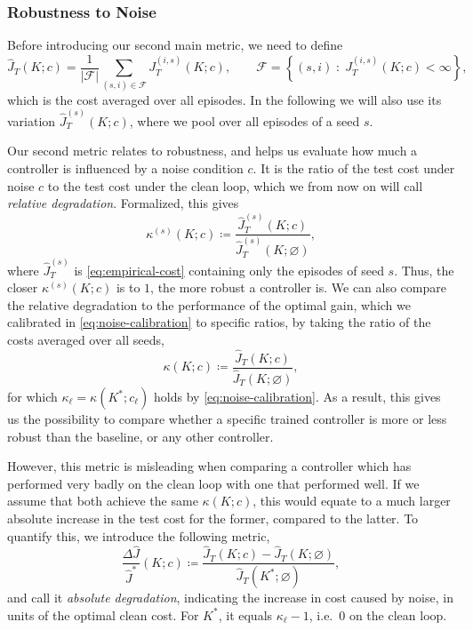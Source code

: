 \subsubsection{Robustness to Noise}
\label{subsubsec:robustness-metric}

Before introducing our second main metric, we need to define 
\begin{equation}
    \label{eq:empirical-cost}
    \hat{J}_T(K; c)
    = \frac{1}{\lvert \mathcal{F} \rvert}
      \sum_{(s,i) \in \mathcal{F}} J^{(i,s)}_T(K; c) ,
    \qquad
    \mathcal{F} = \left\{ (s,i) \;:\; J^{(i,s)}_T(K; c) < \infty \right\} ,
\end{equation}
which is the cost averaged over all episodes. In the following we will also
use its variation $\hat{J}^{(s)}_T(K; c)$, where we pool over all episodes
of a seed $s$.

Our second metric relates to robustness, and helps us evaluate how much a controller is influenced
by a noise condition $c$. It is the ratio of the test cost under noise $c$ to the test cost under
the clean loop, which we from now on will call \emph{relative degradation}. Formalized, this gives
\begin{equation}
    \label{eq:relative-degradation}
    \kappa^{(s)}(K; c) \coloneqq \frac{\hat{J}^{(s)}_T(K; c)}{\hat{J}^{(s)}_T(K; \varnothing)} ,
\end{equation}
where $\hat{J}^{(s)}_T$ is \eqref{eq:empirical-cost} containing only the episodes of seed $s$.
Thus, the closer $\kappa^{(s)}(K; c)$ is to $1$, the more robust a controller is. 
We can also compare the relative degradation to the performance of the optimal gain, which we calibrated in \eqref{eq:noise-calibration}
to specific ratios, by taking the ratio of the costs averaged over all seeds,
\begin{equation}
    \label{eq:relative-degradation-pooled}
    \kappa(K; c) \coloneqq \frac{\hat{J}_T(K; c)}{\hat{J}_T(K; \varnothing)} ,
\end{equation}
for which $\kappa_{\ell} = \kappa(K^{*}; c_{\ell})$ holds by \eqref{eq:noise-calibration}.
As a result, this gives us the possibility to compare whether a specific trained
controller is more or less robust than the baseline, or any other controller.

However, this metric is misleading when comparing a controller which has performed
very badly on the clean loop with one that performed well.
If we assume that both achieve the same $\kappa(K; c)$, this would equate
to a much larger absolute increase in the test cost for the former, compared
to the latter. To quantify this, we introduce the following metric,
\begin{equation}
    \label{eq:absolute-degradation}
    \frac{\Delta \hat{J}}{\hat{J}^{*}}(K; c) \coloneqq \frac{\hat{J}_T(K; c) - \hat{J}_T(K; \varnothing)}{\hat{J}_T(K^{*}; \varnothing)} ,
\end{equation}
and call it \emph{absolute degradation}, indicating the increase in cost caused by noise,
in units of the optimal clean cost. For $K^{*}$, it equals $\kappa_{\ell} - 1$, i.e.\ $0$ on the
clean loop.


